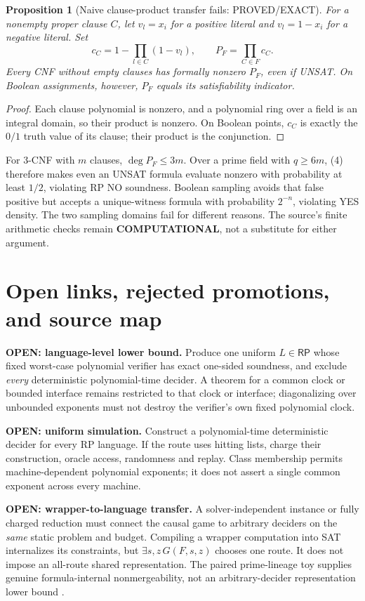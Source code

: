 \documentclass[11pt]{article}
\newtheorem{proposition}[theorem]{Proposition}
\newcommand{\RP}{\mathsf{RP}}
\begin{document}
\begin{proposition}[Naive clause-product transfer fails: PROVED/EXACT]
For a nonempty proper clause $C$, let $v_l=x_i$ for a positive literal and
$v_l=1-x_i$ for a negative literal. Set
\[
 c_C=1-\prod_{l\in C}(1-v_l),\qquad P_F=\prod_{C\in F}c_C.
\]
Every CNF without empty clauses has formally nonzero $P_F$, even if UNSAT.
On Boolean assignments, however, $P_F$ equals its satisfiability indicator.
\end{proposition}
\begin{proof}
Each clause polynomial is nonzero, and a polynomial ring over a field is an
integral domain, so their product is nonzero. On Boolean points, $c_C$ is
exactly the $0/1$ truth value of its clause; their product is the conjunction.
\end{proof}
For 3-CNF with $m$ clauses, $\deg P_F\le3m$. Over a prime field with
$q\ge6m$, (4) therefore makes even an UNSAT formula evaluate nonzero with
probability at least $1/2$, violating RP NO soundness. Boolean sampling avoids
that false positive but accepts a unique-witness formula with probability
$2^{-n}$, violating YES density. The two sampling domains fail for different
reasons. The source's finite arithmetic checks remain \textbf{COMPUTATIONAL},
not a substitute for either argument.

\newpage
\section{Open links, rejected promotions, and source map}
\textbf{OPEN: language-level lower bound.} Produce one uniform $L\in\RP$
whose fixed worst-case polynomial verifier has exact one-sided soundness,
and exclude \emph{every} deterministic polynomial-time decider. A theorem
for a common clock or bounded interface remains restricted to that clock or
interface; diagonalizing over unbounded exponents must not destroy the
verifier's own fixed polynomial clock.

\textbf{OPEN: uniform simulation.} Construct a polynomial-time deterministic
decider for every RP language. If the route uses hitting lists, charge their
construction, oracle access, randomness and replay. Class membership permits
machine-dependent polynomial exponents; it does not assert a single common
exponent across every machine.

\textbf{OPEN: wrapper-to-language transfer.} A solver-independent instance or
fully charged reduction must connect the causal game to arbitrary deciders
on the \emph{same} static problem and budget. Compiling a wrapper computation
into SAT internalizes its constraints, but $\exists s,z\,G(F,s,z)$ chooses
one route. It does not impose an all-route shared representation. The paired
prime-lineage toy supplies genuine formula-internal nonmergeability, not an
arbitrary-decider representation lower bound \cite{wrapper}.
\end{document}
